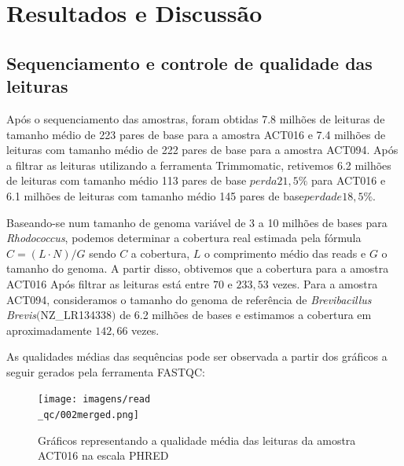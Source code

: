\chapter{Resultados e Discussão}\label{cap:resultados}

\section{Sequenciamento e controle de qualidade das leituras}
Após o sequenciamento das amostras, foram obtidas 7.8 milhões de leituras de tamanho médio de 
223 pares de base para a amostra ACT016 e 7.4 milhões de leituras com tamanho médio de 222 pares de base
para a amostra ACT094. Após a filtrar as leituras utilizando a ferramenta Trimmomatic, retivemos
6.2 milhões de leituras com tamanho médio 113 pares de base \(perda 21,5\%\) para ACT016 e 6.1 milhões
de leituras com tamanho médio 145 pares de base\(perda de 18,5\%\).

Baseando-se num tamanho de genoma variável de 3 a 10 milhões de bases para \textit{Rhodococcus}, podemos
determinar a cobertura real estimada pela fórmula $C= (L\cdot N)/G $ sendo $C$ a cobertura, $L$ o comprimento
médio das reads e $G$ o tamanho do genoma. A partir disso, obtivemos que a cobertura para a amostra ACT016 Após
filtrar as leituras está entre $70$ e $233,53$ vezes. 
Para a amostra ACT094, consideramos o tamanho do genoma de referência de \textit{Brevibacillus Brevis}$($NZ\_LR134338$)$ 
de 6.2 milhões de bases e estimamos a cobertura em aproximadamente $142,66$ vezes.

As qualidades médias das sequências pode ser observada a partir dos gráficos a seguir gerados pela ferramenta FASTQC:

\begin{figure}[H]
	\caption{Gráficos representando a qualidade média das leituras da amostra ACT016 na escala PHRED}
	\centering
	\texttt{[image: imagens/read\\\_qc/002merged.png]} \\
	\centering
\end{figure}

\vspace{\floatsep}

